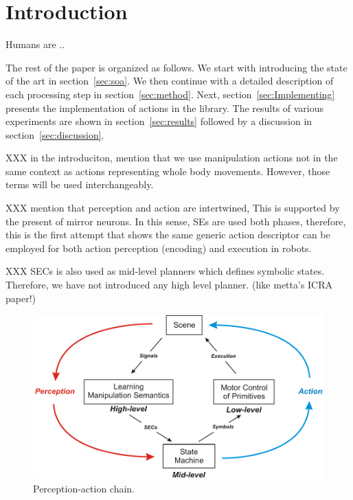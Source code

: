 \section{Introduction}


Humans are  ..
 
The rest of the paper is organized as follows. We start with introducing the state of the art in  section~\ref{sec:soa}. We then continue with a detailed description of each processing step in  section~\ref{sec:method}. 
Next, section~\ref{sec:Implementing} presents the implementation of actions in the library.
The results of various experiments are shown in section~\ref{sec:results} followed by a discussion in  section~\ref{sec:discussion}.


XXX in the introduciton, mention that we use manipulation actions not in the same context as actions representing whole body movements. However, those terms will be used interchangeably. 

XXX mention that perception and action are intertwined, This is supported by the present of mirror neurons. In this sense, SEs are used both phases, therefore, this is the first attempt that shows the same generic action descriptor can be employed for both action perception (encoding) and execution in robots. 

XXX SECs is also used as mid-level planners which defines symbolic states. Therefore, we have not introduced any high level planner. (like metta's ICRA paper!)


\begin{figure}[hb]
      \centering
      \includegraphics[scale=0.5]{./pdf/Figure_PerceptionAction.pdf}
      \caption{ Perception-action chain.}
      \label{fig:per_act_cycle}
\end{figure}

